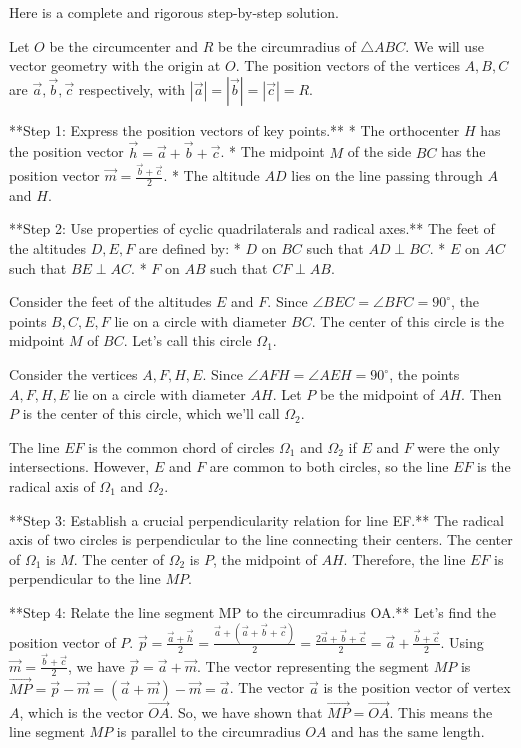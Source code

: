 Here is a complete and rigorous step-by-step solution.

Let $O$ be the circumcenter and $R$ be the circumradius of $\triangle ABC$. We will use vector geometry with the origin at $O$. The position vectors of the vertices $A, B, C$ are $\vec{a}, \vec{b}, \vec{c}$ respectively, with $|\vec{a}|=|\vec{b}|=|\vec{c}|=R$.

**Step 1: Express the position vectors of key points.**
* The orthocenter $H$ has the position vector $\vec{h} = \vec{a}+\vec{b}+\vec{c}$.
* The midpoint $M$ of the side $BC$ has the position vector $\vec{m} = \frac{\vec{b}+\vec{c}}{2}$.
* The altitude $AD$ lies on the line passing through $A$ and $H$.

**Step 2: Use properties of cyclic quadrilaterals and radical axes.**
The feet of the altitudes $D, E, F$ are defined by:
* $D$ on $BC$ such that $AD \perp BC$.
* $E$ on $AC$ such that $BE \perp AC$.
* $F$ on $AB$ such that $CF \perp AB$.

Consider the feet of the altitudes $E$ and $F$. Since $\angle BEC = \angle BFC = 90^\circ$, the points $B, C, E, F$ lie on a circle with diameter $BC$. The center of this circle is the midpoint $M$ of $BC$. Let's call this circle $\Omega_1$.

Consider the vertices $A,F,H,E$. Since $\angle AFH = \angle AEH = 90^\circ$, the points $A, F, H, E$ lie on a circle with diameter $AH$. Let $P$ be the midpoint of $AH$. Then $P$ is the center of this circle, which we'll call $\Omega_2$.

The line $EF$ is the common chord of circles $\Omega_1$ and $\Omega_2$ if $E$ and $F$ were the only intersections. However, $E$ and $F$ are common to both circles, so the line $EF$ is the radical axis of $\Omega_1$ and $\Omega_2$.

**Step 3: Establish a crucial perpendicularity relation for line EF.**
The radical axis of two circles is perpendicular to the line connecting their centers.
The center of $\Omega_1$ is $M$. The center of $\Omega_2$ is $P$, the midpoint of $AH$.
Therefore, the line $EF$ is perpendicular to the line $MP$.

**Step 4: Relate the line segment MP to the circumradius OA.**
Let's find the position vector of $P$.
$\vec{p} = \frac{\vec{a}+\vec{h}}{2} = \frac{\vec{a}+(\vec{a}+\vec{b}+\vec{c})}{2} = \frac{2\vec{a}+\vec{b}+\vec{c}}{2} = \vec{a} + \frac{\vec{b}+\vec{c}}{2}$.
Using $\vec{m} = \frac{\vec{b}+\vec{c}}{2}$, we have $\vec{p} = \vec{a} + \vec{m}$.
The vector representing the segment $MP$ is $\vec{MP} = \vec{p} - \vec{m} = (\vec{a}+\vec{m}) - \vec{m} = \vec{a}$.
The vector $\vec{a}$ is the position vector of vertex $A$, which is the vector $\vec{OA}$.
So, we have shown that $\vec{MP} = \vec{OA}$. This means the line segment $MP$ is parallel to the circumradius $OA$ and has the same length.

